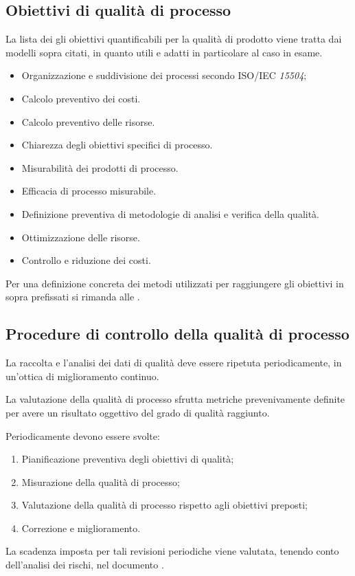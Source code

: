 \documentclass[12pt,a4paper]{article}
\begin{document}
\subsection{Obiettivi di qualità di processo}
La lista dei gli obiettivi quantificabili per la qualità di prodotto viene tratta dai modelli sopra citati, in quanto utili e adatti in particolare al caso in esame.
\begin{itemize}
	\item Organizzazione e suddivisione dei processi secondo ISO/IEC \textit{15504};
	\item Calcolo preventivo dei costi.
	\item Calcolo preventivo delle risorse.
	\item Chiarezza degli obiettivi specifici di processo.
	\item Misurabilità dei prodotti di processo.
	\item Efficacia di processo misurabile.
	\item Definizione preventiva di metodologie di analisi e verifica della qualità.
	\item{Ottimizzazione delle risorse}.
	\item{Controllo e riduzione dei costi}.
\end{itemize}
Per una definizione concreta dei metodi utilizzati per raggiungere gli obiettivi in sopra prefissati si rimanda alle \NdP{}.


\subsection{Procedure di controllo della qualità di processo}
La raccolta e l'analisi dei dati di qualità deve essere ripetuta periodicamente, in un'ottica di miglioramento continuo. 

La valutazione della qualità di processo sfrutta metriche prevenivamente definite per avere un risultato oggettivo del grado di qualità raggiunto.

Periodicamente devono essere svolte:
\begin{enumerate}
	\item Pianificazione preventiva degli obiettivi di qualità;
	\item Misurazione della qualità di processo;
	\item Valutazione della qualità di processo rispetto agli obiettivi preposti;
	\item Correzione e miglioramento.
\end{enumerate}
La scadenza imposta per tali revisioni periodiche viene valutata, tenendo  conto dell'analisi dei rischi, nel documento \PdP{}.
\end{document}
